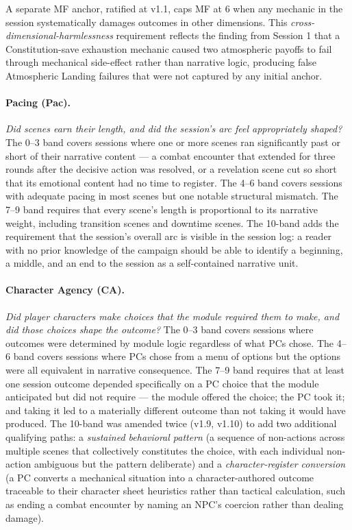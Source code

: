 A separate MF anchor, ratified at v1.1, caps MF at 6 when any mechanic in the session
systematically damages outcomes in other dimensions. This \textit{cross-dimensional-harmlessness}
requirement reflects the finding from Session 1 that a Constitution-save exhaustion
mechanic caused two atmospheric payoffs to fail through mechanical side-effect rather
than narrative logic, producing false Atmospheric Landing failures that were not
captured by any initial anchor.

\paragraph{Pacing (Pac).}
\textit{Did scenes earn their length, and did the session's arc feel appropriately
shaped?}
The 0--3 band covers sessions where one or more scenes ran significantly past or short
of their narrative content --- a combat encounter that extended for three rounds after
the decisive action was resolved, or a revelation scene cut so short that its
emotional content had no time to register. The 4--6 band covers sessions with adequate
pacing in most scenes but one notable structural mismatch. The 7--9 band requires that
every scene's length is proportional to its narrative weight, including transition
scenes and downtime scenes. The 10-band adds the requirement that the session's
overall arc is visible in the session log: a reader with no prior knowledge of the
campaign should be able to identify a beginning, a middle, and an end to the session
as a self-contained narrative unit.

\paragraph{Character Agency (CA).}
\textit{Did player characters make choices that the module required them to make, and
did those choices shape the outcome?}
The 0--3 band covers sessions where outcomes were determined by module logic regardless
of what PCs chose. The 4--6 band covers sessions where PCs chose from a menu of
options but the options were all equivalent in narrative consequence. The 7--9 band
requires that at least one session outcome depended specifically on a PC choice that
the module anticipated but did not require --- the module offered the choice; the PC
took it; and taking it led to a materially different outcome than not taking it would
have produced. The 10-band was amended twice (v1.9, v1.10) to add two additional
qualifying paths: a \textit{sustained behavioral pattern} (a sequence of non-actions
across multiple scenes that collectively constitutes the choice, with each individual
non-action ambiguous but the pattern deliberate) and a \textit{character-register
conversion} (a PC converts a mechanical situation into a character-authored outcome
traceable to their character sheet heuristics rather than tactical calculation, such as
ending a combat encounter by naming an NPC's coercion rather than dealing damage).

